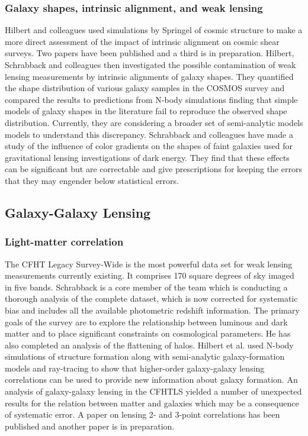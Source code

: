 \documentclass[psfig,11pt]{article}
\begin{document}
{\subsubsection{Galaxy shapes, intrinsic alignment, and weak lensing}
Hilbert and colleagues used simulations by Springel of cosmic structure to make a more direct assessment of the impact of intrinsic alignment on cosmic shear surveys.  Two papers have been published and a third is in preparation. Hilbert, Schrabback and colleagues then investigated the possible contamination of weak lensing measurements by intrinsic alignments of galaxy shapes. They quantified the shape distribution of various galaxy samples in the COSMOS survey and compared the results to predictions from N-body simulations finding that simple models of galaxy shapes in the literature fail to reproduce the observed shape distribution. Currently, they are considering a broader set of semi-analytic models models to understand this discrepancy. Schrabback and colleagues have made a study of the influence of color gradients on the shapes of faint galaxies used for gravitational lensing investigations of dark energy. They find that these effects can be significant but are correctable and give prescriptions for keeping the errors that they may engender below statistical errors.
\subsection{Galaxy-Galaxy Lensing}
\subsubsection{Light-matter correlation}
The CFHT Legacy Survey-Wide is the most powerful data set for weak lensing measurements currently existing. It comprises 170 square degrees of sky imaged in five bands.  Schrabback is a core member of the team which is conducting a thorough analysis of the complete dataset, which is now corrected for systematic bias and includes all the available photometric redshift information. The primary goals of the survey are to explore the relationship between luminous and dark matter and to place significant constraints on cosmological parameters. He has also completed an analysis of  the flattening of halos. Hilbert et al. used N-body simulations of structure formation along with semi-analytic galaxy-formation models and ray-tracing to show that higher-order galaxy-galaxy lensing correlations can be used to provide new information about galaxy formation. An analysis of galaxy-galaxy lensing in the CFHTLS yielded a number of unexpected results for the relation between matter and galaxies which may be a consequence of systematic error. A paper on lensing 2- and 3-point correlations has been published and another paper is in preparation.
}
\end{document}
